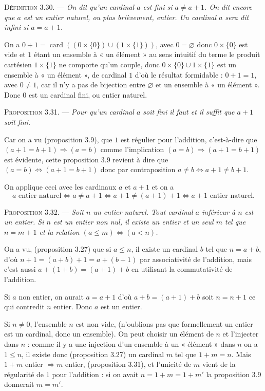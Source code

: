 
\medskip\noindent\textsc{Définition 3.30.} --- \emph{On dit qu'un cardinal $a$ est fini si $a\ne a+1$. On dit encore que $a$ est un entier naturel, ou plus brièvement, entier. Un cardinal $a$ sera dit infini si $a=a+1$.}

On a $0+1=\operatorname{card}((0\times\{0\})\cup(1\times\{1\}))$, avec $0=\varnothing$ donc $0\times\{0\}$ est vide et $1$ étant un ensemble à « un élément » au sens intuitif du terme le produit cartésien $1\times\{1\}$ ne comporte qu'un couple, donc $0\times\{0\}\cup1\times\{1\}$ est un ensemble à « un élément », de cardinal $1$ d'où le résultat formidable : $0+1=1$, avec $0\ne1$, car il n'y a pas de bijection entre $\varnothing$ et un ensemble à « un élément ». Donc $0$ est un cardinal fini, ou entier naturel.

\medskip\noindent\textsc{Proposition 3.31.} --- \emph{Pour qu'un cardinal $a$ soit fini il faut et il suffit que $a+1$ soit fini.}

Car on a vu (proposition 3.9), que $1$ est régulier pour l'addition, c'est-à-dire que $(a+1=b+1)\Rightarrow(a=b)$ comme l'implication $(a=b)\Rightarrow(a+1=b+1)$ est évidente, cette proposition 3.9 revient à dire que $(a=b)\Leftrightarrow(a+1=b+1)$ donc par contraposition $a\ne b\Leftrightarrow a+1\ne b+1$.

On applique ceci avec les cardinaux $a$ et $a+1$ et on a
\[
a\text{ entier naturel}
\Leftrightarrow a\ne a+1
\Leftrightarrow a+1\ne(a+1)+1
\Leftrightarrow a+1\text{ entier naturel}.
\]
\bookend

\medskip\noindent\textsc{Proposition 3.32.} --- \emph{Soit $n$ un entier naturel. Tout cardinal $a$ inférieur à $n$ est un entier. Si $n$ est un entier non nul, il existe un entier et un seul $m$ tel que $n=m+1$ et la relation $(a\le m)\Leftrightarrow(a<n)$.}

On a vu, (proposition 3.27) que si $a\le n$, il existe un cardinal $b$ tel que $n=a+b$, d'où $n+1=(a+b)+1=a+(b+1)$ par associativité de l'addition, mais c'est aussi $a+(1+b)=(a+1)+b$ en utilisant la commutativité de l'addition.

Si $a$ non entier, on aurait $a=a+1$ d'où $a+b=(a+1)+b$ soit $n=n+1$ ce qui contredit $n$ entier. Donc $a$ est un entier.

Si $n\ne0$, l'ensemble $n$ est non vide, (n'oublions pas que formellement un entier est un cardinal, donc un ensemble). On peut choisir un élément de $n$ et l'injecter dans $n$ : comme il y a une injection d'un ensemble à un « élément » dans $n$ on a $1\le n$, il existe donc (proposition 3.27) un cardinal $m$ tel que $1+m=n$. Mais $1+m$ entier $\Rightarrow m$ entier, (proposition 3.31), et l'unicité de $m$ vient de la régularité de $1$ pour l'addition : si on avait $n=1+m=1+m'$ la proposition 3.9 donnerait $m=m'$.

